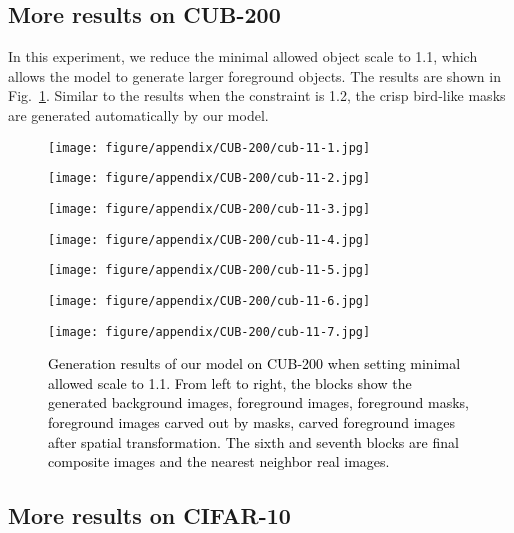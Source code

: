 \documentclass{article} \usepackage{iclr2017_conference,times}
\begin{document}
\subsection{More results on CUB-200}
\label{Appendix_CUB200}
In this experiment, we reduce the minimal allowed object scale to 1.1, which allows the model to generate larger foreground objects. The results are shown in Fig.~\ref{Fig_CUBOutputs_1.1}. Similar to the results when the constraint is 1.2, the crisp bird-like masks are generated automatically by our model.
\begin{figure}[!ht]
\begin{minipage}{0.138\linewidth}
\center
\texttt{[image: figure/appendix/CUB-200/cub-11-1.jpg]}
\end{minipage}
\begin{minipage}{0.138\linewidth}
\center
\texttt{[image: figure/appendix/CUB-200/cub-11-2.jpg]}
\end{minipage}
\begin{minipage}{0.138\linewidth}
\center
\texttt{[image: figure/appendix/CUB-200/cub-11-3.jpg]}
\end{minipage}
\begin{minipage}{0.138\linewidth}
\center
\texttt{[image: figure/appendix/CUB-200/cub-11-4.jpg]}
\end{minipage}
\begin{minipage}{0.138\linewidth}
\center
\texttt{[image: figure/appendix/CUB-200/cub-11-5.jpg]}
\end{minipage}
\begin{minipage}{0.138\linewidth}
\center
\texttt{[image: figure/appendix/CUB-200/cub-11-6.jpg]}
\end{minipage}
\begin{minipage}{0.138\linewidth}
\center
\texttt{[image: figure/appendix/CUB-200/cub-11-7.jpg]}
\end{minipage}
\caption{\textcolor{black}{Generation results of our model on CUB-200 when setting minimal allowed scale to 1.1. From left to right, the blocks show the generated background images, foreground images, foreground masks, foreground images carved out by masks, carved foreground images after spatial transformation. The sixth and seventh blocks are final composite images and the nearest neighbor real images.}}
\label{Fig_CUBOutputs_1.1}
\end{figure} 


\subsection{More results on CIFAR-10}
\end{document}
